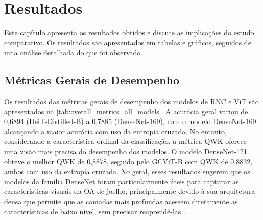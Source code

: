 \chapter{Resultados} \label{cap:resultados}

Este capítulo apresenta os resultados obtidos e discute as implicações do estudo comparativo. Os resultados são apresentados em tabelas e gráficos, seguidos de uma análise detalhada do que foi observado.

\section{Métricas Gerais de Desempenho}

Os resultados das métricas gerais de desempenho dos modelos de RNC e ViT são apresentados na \autoref{tab:overall_metrics_all_models}. A acurácia geral variou de 0,6894 (DeiT-Distilled-B) a 0,7885 (DenseNet-169), com o modelo DenseNet-169 alcançando a maior acurácia com uso da entropia cruzada. No entanto, considerando a característica ordinal da classificação, a métrica QWK oferece uma visão mais precisa do desempenho dos modelos. O modelo DenseNet-121 obteve o melhor QWK de 0,8878, seguido pelo GCViT-B com QWK de 0,8832, ambos com uso da entropia cruzada. No geral, esses resultados sugerem que os modelos da família DenseNet foram particularmente úteis para capturar as características visuais da OA de joelho, principalmente devido à sua arquitetura densa que permite que as camadas mais profundas acessem diretamente as características de baixo nível, sem precisar reaprendê-las .

